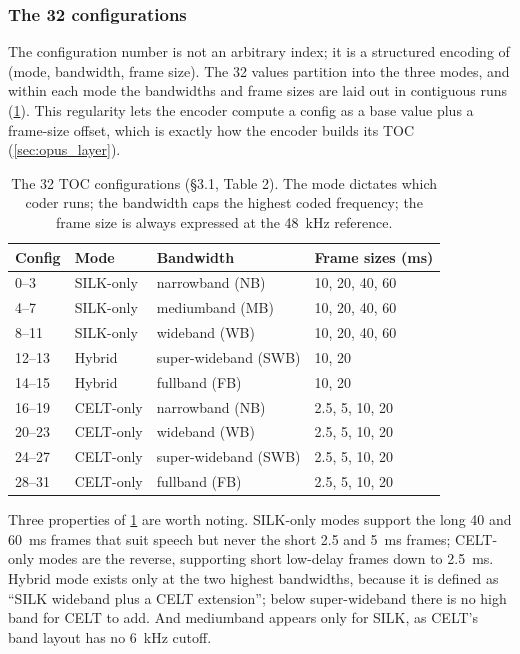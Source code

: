 \subsubsection{The 32 configurations}

The configuration number is not an arbitrary index; it is a structured encoding
of (mode, bandwidth, frame size). The 32 values partition into the three modes,
and within each mode the bandwidths and frame sizes are laid out in contiguous
runs (\cref{tab:configs}). This regularity lets the encoder compute a config as
a base value plus a frame-size offset, which is exactly how the encoder builds
its TOC (\cref{sec:opus_layer}).

\begin{table}[h]
  \centering
  \begin{tabular}{llll}
    \toprule
    \textbf{Config} & \textbf{Mode} & \textbf{Bandwidth} & \textbf{Frame sizes (ms)} \\
    \midrule
    0--3   & SILK-only & narrowband (NB)      & 10, 20, 40, 60 \\
    4--7   & SILK-only & mediumband (MB)      & 10, 20, 40, 60 \\
    8--11  & SILK-only & wideband (WB)        & 10, 20, 40, 60 \\
    12--13 & Hybrid    & super-wideband (SWB) & 10, 20 \\
    14--15 & Hybrid    & fullband (FB)        & 10, 20 \\
    16--19 & CELT-only & narrowband (NB)      & 2.5, 5, 10, 20 \\
    20--23 & CELT-only & wideband (WB)        & 2.5, 5, 10, 20 \\
    24--27 & CELT-only & super-wideband (SWB) & 2.5, 5, 10, 20 \\
    28--31 & CELT-only & fullband (FB)        & 2.5, 5, 10, 20 \\
    \bottomrule
  \end{tabular}
  \caption{The 32 TOC configurations (\S3.1, Table 2). The mode dictates which
  coder runs; the bandwidth caps the highest coded frequency; the frame size is
  always expressed at the 48~kHz reference.}
  \label{tab:configs}
\end{table}

Three properties of \cref{tab:configs} are worth noting. SILK-only modes support
the long 40 and 60~ms frames that suit speech but never the short 2.5 and 5~ms
frames; CELT-only modes are the reverse, supporting short low-delay frames down
to 2.5~ms. Hybrid mode exists only at the two highest bandwidths, because it is
defined as ``SILK wideband plus a CELT extension''; below super-wideband there
is no high band for CELT to add. And mediumband appears only for SILK, as CELT's
band layout has no 6~kHz cutoff.

